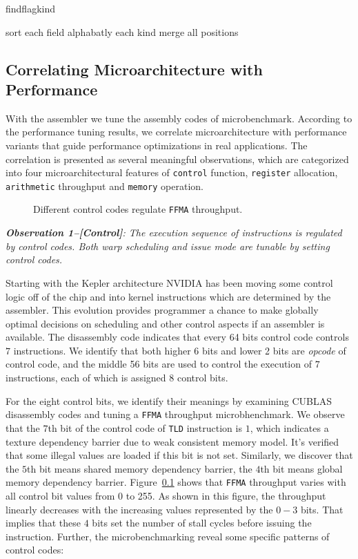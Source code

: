 \documentclass{sig-alternate-05-2015}
\begin{document}
\begin{algorithm}
      \caption{findflagkind}\label{opcode}
  \begin{algorithmic}[1]
      \State sort each field alphabatly
      \For each kind 
      \State merge all positions
      \EndFor
  \end{algorithmic}
\end{algorithm}

\subsection{Correlating Microarchitecture with Performance}
With the assembler we tune the assembly codes of microbenchmark. According to the performance tuning results, we correlate microarchitecture with performance variants that guide performance optimizations in real applications. The correlation is presented as several meaningful observations, which are categorized into four microarchitectural features of {\tt control} function, {\tt register} allocation, {\tt arithmetic} throughput and {\tt memory} operation.

\begin{figure}[htbp]
\begin{center}
\caption{Different control codes regulate {\tt FFMA} throughput.}
\label{fig:control}
\end{center}
\end{figure}

{\em {\bf Observation 1--[Control]}: The execution sequence of instructions is regulated by control codes. Both warp scheduling and issue mode are tunable by setting control codes.}

Starting with the Kepler architecture NVIDIA has been moving some control logic off of the chip and into kernel instructions which are determined by the assembler. This evolution provides programmer a chance to make globally optimal decisions on scheduling and other control aspects if an assembler is available. The disassembly code indicates that every 64 bits control code controls $7$ instructions. We identify that both higher $6$ bits and lower 2 bits are {\em opcode} of control code, and the middle 56 bits are used to control the execution of $7$ instructions, each of which is assigned $8$ control bits.

For the eight control bits, we identify their meanings by examining CUBLAS disassembly codes and tuning a {\tt FFMA} throughput microbhenchmark. We observe that the $7$th bit of the control code of {\tt TLD} instruction is $1$, which indicates a texture dependency barrier due to weak consistent memory model. It's verified that some illegal values are loaded if this bit is not set. Similarly, we discover that the $5$th bit means shared memory dependency barrier, the $4$th bit means global memory dependency barrier. Figure~\ref{} shows that {\tt FFMA} throughput varies with all control bit values from 0 to 255. As shown in this figure, the throughput linearly decreases with the increasing values represented by the $0-3$ bits. That implies that these $4$ bits set the number of stall cycles before issuing the instruction. Further, the microbenchmarking reveal some specific patterns of control codes:
\end{document}
